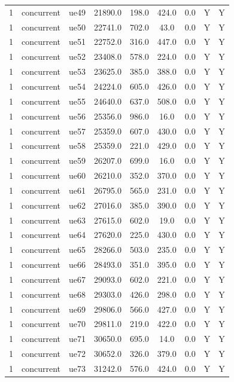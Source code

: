 \begin{table}[ht]
\begin{tabular}{|c|c|c|c|c|c|c|c|c|}
1 & concurrent & ue49 & 21890.0 & 198.0 & 424.0 & 0.0 & Y & Y \\
1 & concurrent & ue50 & 22741.0 & 702.0 & 43.0 & 0.0 & Y & Y \\
1 & concurrent & ue51 & 22752.0 & 316.0 & 447.0 & 0.0 & Y & Y \\
1 & concurrent & ue52 & 23408.0 & 578.0 & 224.0 & 0.0 & Y & Y \\
1 & concurrent & ue53 & 23625.0 & 385.0 & 388.0 & 0.0 & Y & Y \\
1 & concurrent & ue54 & 24224.0 & 605.0 & 426.0 & 0.0 & Y & Y \\
1 & concurrent & ue55 & 24640.0 & 637.0 & 508.0 & 0.0 & Y & Y \\
1 & concurrent & ue56 & 25356.0 & 986.0 & 16.0 & 0.0 & Y & Y \\
1 & concurrent & ue57 & 25359.0 & 607.0 & 430.0 & 0.0 & Y & Y \\
1 & concurrent & ue58 & 25359.0 & 221.0 & 429.0 & 0.0 & Y & Y \\
1 & concurrent & ue59 & 26207.0 & 699.0 & 16.0 & 0.0 & Y & Y \\
1 & concurrent & ue60 & 26210.0 & 352.0 & 370.0 & 0.0 & Y & Y \\
1 & concurrent & ue61 & 26795.0 & 565.0 & 231.0 & 0.0 & Y & Y \\
1 & concurrent & ue62 & 27016.0 & 385.0 & 390.0 & 0.0 & Y & Y \\
1 & concurrent & ue63 & 27615.0 & 602.0 & 19.0 & 0.0 & Y & Y \\
1 & concurrent & ue64 & 27620.0 & 225.0 & 430.0 & 0.0 & Y & Y \\
1 & concurrent & ue65 & 28266.0 & 503.0 & 235.0 & 0.0 & Y & Y \\
1 & concurrent & ue66 & 28493.0 & 351.0 & 395.0 & 0.0 & Y & Y \\
1 & concurrent & ue67 & 29093.0 & 602.0 & 221.0 & 0.0 & Y & Y \\
1 & concurrent & ue68 & 29303.0 & 426.0 & 298.0 & 0.0 & Y & Y \\
1 & concurrent & ue69 & 29806.0 & 566.0 & 427.0 & 0.0 & Y & Y \\
1 & concurrent & ue70 & 29811.0 & 219.0 & 422.0 & 0.0 & Y & Y \\
1 & concurrent & ue71 & 30650.0 & 695.0 & 14.0 & 0.0 & Y & Y \\
1 & concurrent & ue72 & 30652.0 & 326.0 & 379.0 & 0.0 & Y & Y \\
1 & concurrent & ue73 & 31242.0 & 576.0 & 424.0 & 0.0 & Y & Y \\

\end{tabular}
\end{table}

